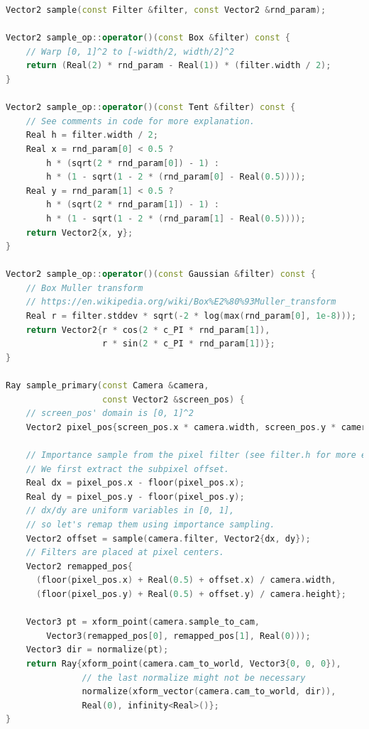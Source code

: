 \begin{lstlisting}[language=c++]
Vector2 sample(const Filter &filter, const Vector2 &rnd_param);

Vector2 sample_op::operator()(const Box &filter) const {
    // Warp [0, 1]^2 to [-width/2, width/2]^2
    return (Real(2) * rnd_param - Real(1)) * (filter.width / 2);
}

Vector2 sample_op::operator()(const Tent &filter) const {
    // See comments in code for more explanation.
    Real h = filter.width / 2;
    Real x = rnd_param[0] < 0.5 ? 
        h * (sqrt(2 * rnd_param[0]) - 1) :
        h * (1 - sqrt(1 - 2 * (rnd_param[0] - Real(0.5))));
    Real y = rnd_param[1] < 0.5 ? 
        h * (sqrt(2 * rnd_param[1]) - 1) :
        h * (1 - sqrt(1 - 2 * (rnd_param[1] - Real(0.5))));
    return Vector2{x, y};
}

Vector2 sample_op::operator()(const Gaussian &filter) const {
    // Box Muller transform
    // https://en.wikipedia.org/wiki/Box%E2%80%93Muller_transform
    Real r = filter.stddev * sqrt(-2 * log(max(rnd_param[0], 1e-8)));
    return Vector2{r * cos(2 * c_PI * rnd_param[1]),
                   r * sin(2 * c_PI * rnd_param[1])};
}

Ray sample_primary(const Camera &camera,
                   const Vector2 &screen_pos) {
    // screen_pos' domain is [0, 1]^2
    Vector2 pixel_pos{screen_pos.x * camera.width, screen_pos.y * camera.height};

    // Importance sample from the pixel filter (see filter.h for more explanation).
    // We first extract the subpixel offset.
    Real dx = pixel_pos.x - floor(pixel_pos.x);
    Real dy = pixel_pos.y - floor(pixel_pos.y);
    // dx/dy are uniform variables in [0, 1],
    // so let's remap them using importance sampling.
    Vector2 offset = sample(camera.filter, Vector2{dx, dy});
    // Filters are placed at pixel centers.
    Vector2 remapped_pos{
      (floor(pixel_pos.x) + Real(0.5) + offset.x) / camera.width,
      (floor(pixel_pos.y) + Real(0.5) + offset.y) / camera.height};

    Vector3 pt = xform_point(camera.sample_to_cam,
        Vector3(remapped_pos[0], remapped_pos[1], Real(0)));
    Vector3 dir = normalize(pt);
    return Ray{xform_point(camera.cam_to_world, Vector3{0, 0, 0}),
               // the last normalize might not be necessary
               normalize(xform_vector(camera.cam_to_world, dir)),
               Real(0), infinity<Real>()};
}
\end{lstlisting}

